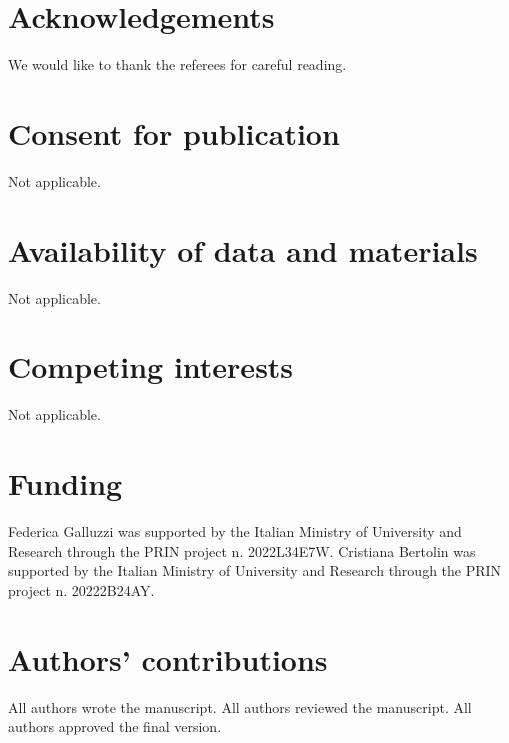 \documentclass[11pt]{amsart}
\theoremstyle{definition}
\numberwithin{equation}{section}
\begin{document}
\section{Acknowledgements}

We would like to thank the referees for careful reading.

\section{Consent for publication}

Not applicable.

 \section{Availability of data and materials}
 
 Not applicable.
 
 \section{Competing interests}
 
 Not applicable.
 
 \section{Funding}
 
 Federica Galluzzi was supported by the Italian Ministry of University and Research through the PRIN project n. 2022L34E7W.
 Cristiana Bertolin was supported by the Italian Ministry of University and Research through the PRIN project n. 20222B24AY.
 
 \section{Authors' contributions}
 All authors wrote the manuscript. All authors reviewed the manuscript. All authors approved the final version.
 
\end{document}
